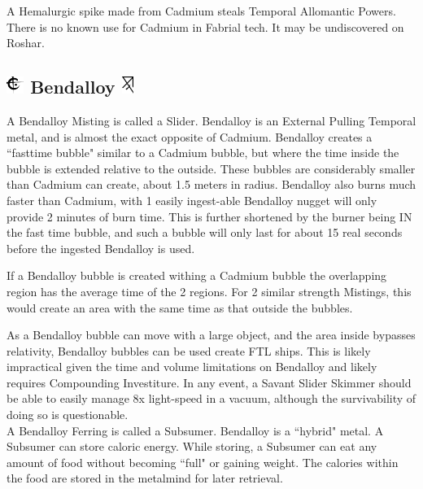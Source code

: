 \documentclass[conference]{IEEEtran}
\begin{document}
A Hemalurgic spike made from Cadmium steals Temporal Allomantic Powers.\cite{HE-TB}\\

There is no known use for Cadmium in Fabrial tech.  It may be undiscovered on Roshar.

\subsection*{\includegraphics[height=1em]{images/Bendalloy.png}  Bendalloy \includegraphics[height=1em]{images/Bendalloy_(Feruchemy).png}}
A Bendalloy Misting is called a Slider.\cite{ARS}  Bendalloy is an External Pulling Temporal metal,\cite{AL-TB} and is almost the exact opposite of Cadmium.  Bendalloy creates a ``fasttime bubble" similar to a Cadmium bubble, but where the time inside the bubble is extended relative to the outside.\cite{ARS}  These bubbles are considerably smaller than Cadmium can create, about 1.5 meters in radius.\cite{AoL-CH18}  Bendalloy also burns much faster than Cadmium,\cite{BoM-CH8} with 1 easily ingest-able Bendalloy nugget will only provide 2 minutes of burn time.  This is further shortened by the burner being IN the fast time bubble, and such a bubble will only last for about 15 real seconds before the ingested Bendalloy is used.\cite{AoL-CH12}

If a Bendalloy bubble is created withing a Cadmium bubble the overlapping region has the average time of the 2 regions.  For 2 similar strength Mistings, this would create an area with the same time as that outside the bubbles.  \cite{AoL-CH12}

As a Bendalloy bubble can move with a large object,\cite{BoM-CH8} and the area inside bypasses relativity, Bendalloy bubbles can be used create FTL ships.  This is likely impractical given the time and volume limitations on Bendalloy and likely requires Compounding Investiture.
In any event, a Savant\cite{BoM-CH17} Slider Skimmer\cite{Massless} should be able to easily manage 8x light-speed in a vacuum, although the survivability of doing so is questionable.\\

A Bendalloy Ferring is called a Subsumer.\cite{ARS}  Bendalloy is a ``hybrid" metal.\cite{FE-TB}  A Subsumer can store caloric energy.\cite{ARS}  While storing, a Subsumer can eat any amount of food without becoming ``full" or gaining weight.  The calories within the food are stored in the metalmind for later retrieval.\cite{ARS}
\end{document}
